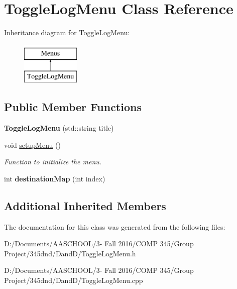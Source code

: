 \hypertarget{class_toggle_log_menu}{}\section{Toggle\+Log\+Menu Class Reference}
\label{class_toggle_log_menu}
Inheritance diagram for Toggle\+Log\+Menu\+:\begin{figure}[H]
\begin{center}
\leavevmode
\includegraphics[height=2.000000cm]{class_toggle_log_menu}
\end{center}
\end{figure}
\subsection*{Public Member Functions}
\begin{DoxyCompactItemize}
\item 
\hypertarget{class_toggle_log_menu_ab95331f73e6fb4aa0f359141fd49106c}{}\label{class_toggle_log_menu_ab95331f73e6fb4aa0f359141fd49106c} 
{\bfseries Toggle\+Log\+Menu} (std\+::string title)
\item 
\hypertarget{class_toggle_log_menu_a13139e2c008d301a24017033af11fe19}{}\label{class_toggle_log_menu_a13139e2c008d301a24017033af11fe19} 
void \hyperlink{class_toggle_log_menu_a13139e2c008d301a24017033af11fe19}{setup\+Menu} ()
\begin{DoxyCompactList}\small\item\em Function to initialize the menu. \end{DoxyCompactList}\item 
\hypertarget{class_toggle_log_menu_a2b2f26e3702ad994b6c497e53a63835b}{}\label{class_toggle_log_menu_a2b2f26e3702ad994b6c497e53a63835b} 
int {\bfseries destination\+Map} (int index)
\end{DoxyCompactItemize}
\subsection*{Additional Inherited Members}


The documentation for this class was generated from the following files\+:\begin{DoxyCompactItemize}
\item 
D\+:/\+Documents/\+A\+A\+S\+C\+H\+O\+O\+L/3-\/ Fall 2016/\+C\+O\+M\+P 345/\+Group Project/345dnd/\+Dand\+D/Toggle\+Log\+Menu.\+h\item 
D\+:/\+Documents/\+A\+A\+S\+C\+H\+O\+O\+L/3-\/ Fall 2016/\+C\+O\+M\+P 345/\+Group Project/345dnd/\+Dand\+D/Toggle\+Log\+Menu.\+cpp\end{DoxyCompactItemize}
